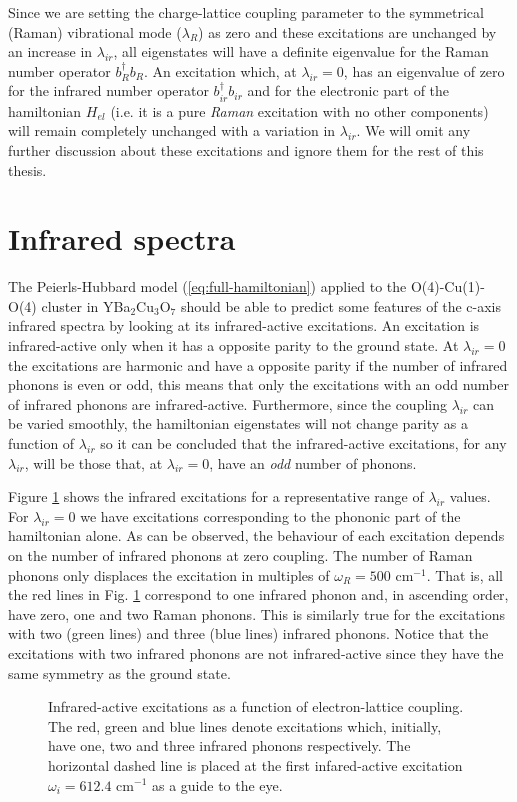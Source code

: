 Since we are setting the charge-lattice coupling parameter to the symmetrical (Raman) vibrational mode ($\lambda_R$) as zero and these excitations are unchanged by an increase in $\lambda_{ir}$, all eigenstates will have a definite eigenvalue for the Raman number operator $b_R^\dagger b_R$. 
An excitation which, at $\lambda_{ir}=0$, has an eigenvalue of zero for the infrared number operator $b_{ir}^\dagger b_{ir}$ and for the electronic part of the hamiltonian $H_{el}$ (i.e. it is a pure \textit{Raman} excitation with no other components) will remain completely unchanged with a variation in $\lambda_{ir}$.
We will omit any further discussion about these excitations and ignore them for the rest of this thesis. 


\section{Infrared spectra}
\label{sec:irSpectra}

The Peierls-Hubbard model (\ref{eq:full-hamiltonian}) applied to the O(4)-Cu(1)-O(4) cluster in YBa$_2$Cu$_3$O$_7$ should be able to predict some features of the c-axis infrared spectra by looking at its infrared-active excitations.
An excitation is infrared-active only when it has a opposite parity to the ground state.
At $\lambda_{ir}=0$ the excitations are harmonic and have a opposite parity if the number of infrared phonons is even or odd, this means that only the excitations with an odd number of infrared phonons are infrared-active.
Furthermore, since the coupling $\lambda_{ir}$ can be varied smoothly, the hamiltonian eigenstates will not change parity as a function of $\lambda_{ir}$ so it can be concluded that the infrared-active excitations, for any $\lambda_{ir}$, will be those that, at $\lambda_{ir}=0$, have an \textit{odd} number of phonons.

Figure \ref{fig:irSpectra} shows the infrared excitations for a representative range of $\lambda_{ir}$ values.
For $\lambda_{ir}=0$ we have excitations corresponding to the phononic part of the hamiltonian alone.
As can be observed, the behaviour of each excitation depends on the number of infrared phonons at zero coupling.
The number of Raman phonons only displaces the excitation in multiples of $\omega_R=500$ cm$^{-1}$.
That is, all the red lines in Fig. \ref{fig:irSpectra} correspond to one infrared phonon and, in ascending order, have zero, one and two Raman phonons.
This is similarly true for the excitations with two (green lines) and three (blue lines) infrared phonons.
Notice that the excitations with two infrared phonons are not infrared-active since they have the same symmetry as the ground state.
%
\begin{figure}[ht]
  \centering
  
  \caption[Infrared-active excitations as a function of electron-lattice coupling.]
  {Infrared-active excitations as a function of electron-lattice coupling.
  The red, green and blue lines denote excitations which, initially, have one, two and three infrared phonons respectively.
  The horizontal dashed line is placed at the first infared-active excitation $\omega_i=612.4$ cm$^{-1}$ as a guide to the eye.}
  \label{fig:irSpectra}
\end{figure}

